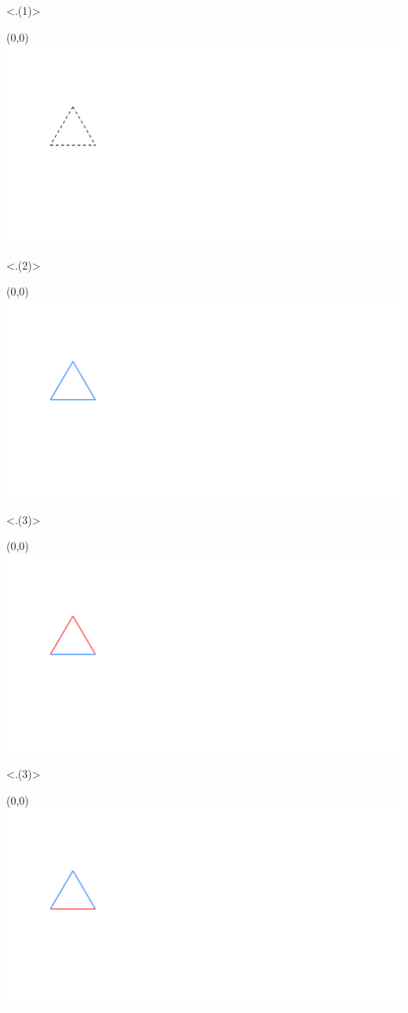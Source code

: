 \only<.(1)>{
  \begin{textblock}{1}(0,0)
    \includegraphics{friends_layer1}
  \end{textblock}
}
\only<.(2)>{
  \begin{textblock}{1}(0,0)
    \includegraphics{friends_g6}
  \end{textblock}
}
\only<.(3)>{
  \begin{textblock}{1}(0,0)
    \includegraphics{friends_g9}
  \end{textblock}
}
\only<.(3)>{
  \begin{textblock}{1}(0,0)
    \includegraphics{friends_g12}
  \end{textblock}
}
